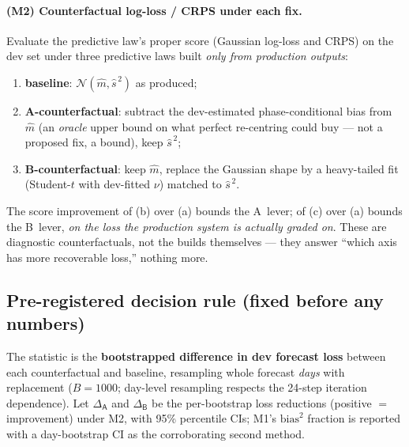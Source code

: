 \documentclass[11pt]{article}
\newcommand{\Nrm}{\mathcal{N}}
\newcommand{\defA}{\textsf{A}}
\newcommand{\defB}{\textsf{B}}
\begin{document}
\paragraph{(M2) Counterfactual log-loss / CRPS under each fix.}
Evaluate the predictive law's proper score (Gaussian log-loss and CRPS)
on the dev set under three predictive laws built \emph{only from
production outputs}:
\begin{enumerate}[label=(\alph*),leftmargin=2.2em]
  \item \textbf{baseline}: $\Nrm(\widehat{m},\widehat{s}^{\,2})$ as
        produced;
  \item \textbf{\defA-counterfactual}: subtract the dev-estimated
        phase-conditional bias from $\widehat{m}$ (an \emph{oracle}
        upper bound on what perfect re-centring could buy --- not a
        proposed fix, a bound), keep $\widehat{s}^{\,2}$;
  \item \textbf{\defB-counterfactual}: keep $\widehat{m}$, replace the
        Gaussian shape by a heavy-tailed fit (Student-$t$ with dev-fitted
        $\nu$) matched to $\widehat{s}^{\,2}$.
\end{enumerate}
The score improvement of (b) over (a) bounds the \defA\ lever; of (c)
over (a) bounds the \defB\ lever, \emph{on the loss the production system
is actually graded on}. These are diagnostic counterfactuals, not the
builds themselves --- they answer ``which axis has more recoverable
loss,'' nothing more.

\subsection{Pre-registered decision rule (fixed before any numbers)}
\label{sec:rule}

The statistic is the \textbf{bootstrapped difference in dev forecast
loss} between each counterfactual and baseline, resampling whole forecast
\emph{days} with replacement ($B=1000$; day-level resampling respects the
24-step iteration dependence). Let
$\Delta_\defA$ and $\Delta_\defB$ be the per-bootstrap loss reductions
(positive $=$ improvement) under M2, with 95\% percentile CIs; M1's
$\mathrm{bias}^2$ fraction is reported with a day-bootstrap CI as the
corroborating second method.
\end{document}
